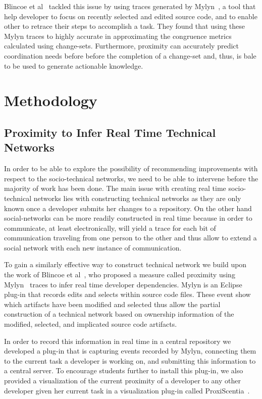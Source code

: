 Blincoe et al~\cite{} tackled this issue by using traces generated by Mylyn~\cite{}, a tool that help developer to focus on recently selected and edited source code, and to enable other to retrace their steps to accomplish a task.
They found that using these Mylyn traces to highly accurate in approximating the congruence metrics calculated using change-sets.
Furthermore, proximity can accurately predict coordination needs before before the completion of a change-set and, thus, is bale to be used to generate actionable knowledge.

\section{Methodology}
\subsection{Proximity to Infer Real Time Technical Networks}
\label{chap:making:subset:proximity}
In order to be able to explore the possibility of recommending improvements with respect to the socio-technical networks, we need to be able to intervene before the majority of work has been done.
The main issue with creating real time socio-technical networks lies with constructing technical networks as they are only known once a developer submits her changes to a repository.
On the other hand social-networks can be more readily constructed in real time because in order to communicate, at least electronically, will yield a trace for each bit of communication traveling from one person to the other and thus allow to extend a social network with each new instance of communication.

To gain a similarly effective way to construct technical network we build upon the work of Blincoe et al~\cite{}, who proposed a measure called proximity using Mylyn~\cite{} traces to infer real time developer dependencies.
Mylyn is an Eclipse plug-in that records edits and selects within source code files.
These event show which artifacts have been modified and selected thus allow the partial construction of a technical network based on ownership information of the modified, selected, and implicated source code artifacts.

In order to record this information in real time in a central repository we developed a plug-in that is capturing events recorded by Mylyn, connecting them to the current task a developer is working on, and submitting this information to a central server. 
To encourage students further to install this plug-in, we also provided a visualization of the current proximity of a developer to any other developer given her current task in a visualization plug-in called ProxiScentia~\cite{}.

